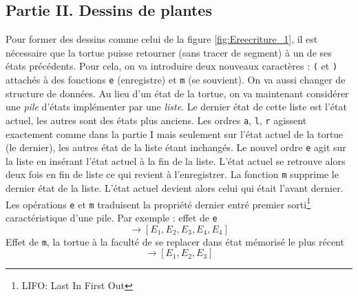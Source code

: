 \subsection*{Partie II. Dessins de plantes}
Pour former des dessins comme celui de la figure \ref{fig:Ereecriture_1}, il est nécessaire que la tortue puisse retourner (sans tracer de segment) à un de ses états précédents.\newline
Pour cela, on va introduire deux nouveaux caractères : \verb|(| et \verb|)| attachés à des fonctions \verb|e| (enregistre) et \verb|m| (se souvient).\newline
On va aussi changer de structure de données. Au lieu d'un état de la tortue, on va maintenant considérer une \emph{pile} d'états implémenter par une \emph{liste}. Le dernier état de cette liste est l'état \og actuel\fg, les autres sont des états plus anciens. Les ordres \verb|a|, \verb|l|, \verb|r| agissent exactement comme dans la partie I mais seulement sur l'état actuel de la tortue (le dernier), les autres état de la liste étant inchangés.\newline
Le nouvel ordre \verb|e| agit sur la liste en insérant l'état actuel à la fin de la liste. L'état actuel se retrouve alors deux fois en fin de liste ce qui revient à l'enregistrer.\newline
La fonction \verb|m| supprime le dernier état de la liste. L'état actuel devient alors celui qui était l'avant dernier.\newline
Les opérations \verb|e| et \verb|m| traduisent la propriété \og dernier entré premier sorti\fg\footnote{LIFO: Last In First Out} caractéristique d'une pile.\newline
Par exemple : effet de \verb|e|
\begin{displaymath}
 [E_1,E_2,E_3,E_4] \rightarrow [E_1,E_2,E_3,E_4,E_4]
\end{displaymath}
Effet de \verb|m|, la tortue à la faculté de se replacer dans état mémorisé le plus récent
\begin{displaymath}
 [E_1,E_2,E_3,E_4] \rightarrow [E_1,E_2,E_3]
\end{displaymath}

